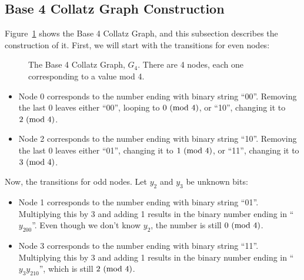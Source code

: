  \subsection{Base 4 Collatz Graph Construction} \label{subsubsec:proofbase4graph}
Figure~\ref{fig:base_4_graph} shows the Base 4 Collatz Graph, and this subsection describes the construction of it. First, we will start with the transitions for even nodes:
\begin{figure}
    \centering
    \caption{The Base 4 Collatz Graph, $G_4$. There are 4 nodes, each one corresponding to a value mod 4.}
    \label{fig:base_4_graph}
\end{figure}

\begin{itemize}
    \item Node 0 corresponds to the number ending with binary string ``00''. Removing the last 0 leaves either ``00'', looping to $0\ (\mathrm{mod}\ 4)$, or ``10'', changing it to $2\ (\mathrm{mod}\ 4)$.
    \item Node 2 corresponds to the number ending with binary string ``10''. Removing the last 0 leaves either ``01'', changing it to $1\ (\mathrm{mod}\ 4)$, or ``11'', changing it to $3\ (\mathrm{mod}\ 4)$.
\end{itemize}
Now, the transitions for odd nodes. Let $y_2$ and $y_3$ be unknown bits:
\begin{itemize}
    \item Node 1 corresponds to the number ending with binary string ``01''. Multiplying this by 3 and adding 1 results in the binary number ending in ``$y_200$''. Even though we don't know $y_2$, the number is still $0\ (\mathrm{mod}\ 4)$.
    \item Node 3 corresponds to the number ending with binary string ``11''. Multiplying this by 3 and adding 1 results in the binary number ending in ``$y_3y_210$'', which is still $2\ (\mathrm{mod}\ 4)$.
\end{itemize}

